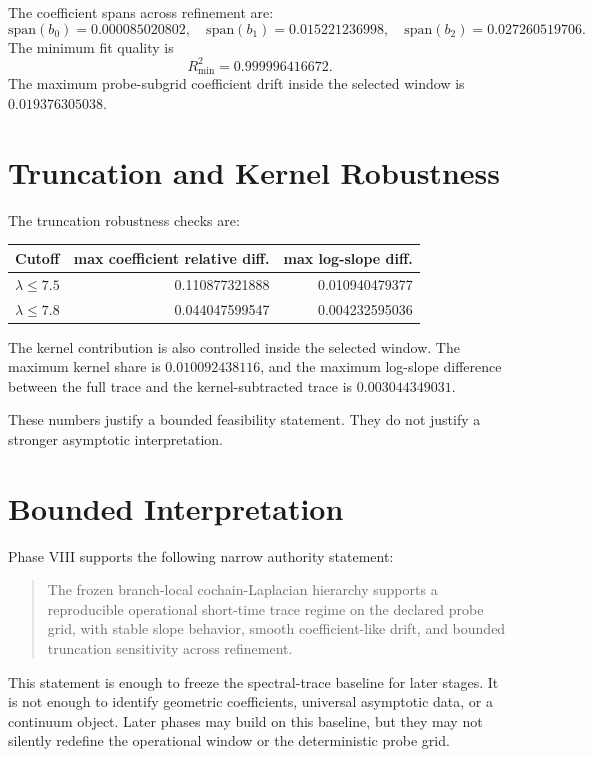 \documentclass[11pt]{article}
\begin{document}
The coefficient spans across refinement are:
\[
\mathrm{span}(b_0)=0.000085020802,\quad
\mathrm{span}(b_1)=0.015221236998,\quad
\mathrm{span}(b_2)=0.027260519706.
\]
The minimum fit quality is
\[
R^2_{\min} = 0.999996416672.
\]
The maximum probe-subgrid coefficient drift inside the selected window is $0.019376305038$.

\section{Truncation and Kernel Robustness}

The truncation robustness checks are:
\begin{center}
\begin{tabular}{@{}lrr@{}}
\toprule
Cutoff & max coefficient relative diff. & max log-slope diff. \\
\midrule
$\lambda \le 7.5$ & 0.110877321888 & 0.010940479377 \\
$\lambda \le 7.8$ & 0.044047599547 & 0.004232595036 \\
\bottomrule
\end{tabular}
\end{center}

The kernel contribution is also controlled inside the selected window. The maximum kernel share is $0.010092438116$, and the maximum log-slope difference between the full trace and the kernel-subtracted trace is $0.003044349031$.

These numbers justify a bounded feasibility statement. They do not justify a stronger asymptotic interpretation.

\section{Bounded Interpretation}

Phase VIII supports the following narrow authority statement:
\begin{quote}
The frozen branch-local cochain-Laplacian hierarchy supports a reproducible operational short-time trace regime on the declared probe grid, with stable slope behavior, smooth coefficient-like drift, and bounded truncation sensitivity across refinement.
\end{quote}

This statement is enough to freeze the spectral-trace baseline for later stages. It is not enough to identify geometric coefficients, universal asymptotic data, or a continuum object. Later phases may build on this baseline, but they may not silently redefine the operational window or the deterministic probe grid.
\end{document}
